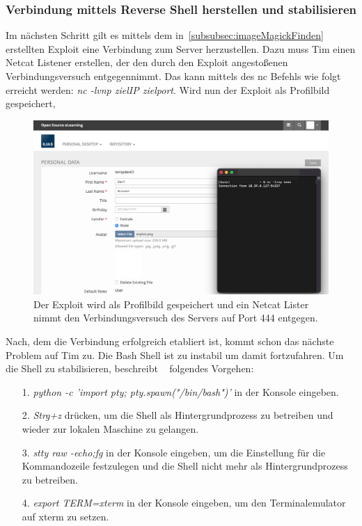 \documentclass[10pt, a4paper,onecolumn ,titlepage]{article}
\begin{document}
    \subsubsection{Verbindung mittels Reverse Shell herstellen und stabilisieren}
    \label{subsubsec:verbindunHerstellen}
    Im nächsten Schritt gilt es mittels dem in~\ref{subsubsec:imageMagickFinden} erstellten Exploit eine Verbindung zum Server herzustellen.
    Dazu muss Tim einen Netcat Listener erstellen, der den durch den Exploit angestoßenen Verbindungsversuch entgegennimmt.
    Das kann mittels des nc Befehls wie folgt erreicht werden: \textit{nc -lvnp zielIP zielport}.
    Wird nun der Exploit als Profilbild gespeichert,
    \begin{figure}[H]
        \centering
        \includegraphics[width=1\textwidth]{storyline_bilder_vm2/VerbindungDa}
        \caption{Der Exploit wird als Profilbild gespeichert und ein Netcat Lister nimmt den Verbindungsversuch des Servers auf Port 444 entgegen.}
        \label{fig:exploitHochladen}
    \end{figure}
    \noindent
    Nach, dem die Verbindung erfolgreich etabliert ist, kommt schon das nächste Problem auf Tim zu.
    Die Bash Shell ist zu instabil um damit fortzufahren.
    Um die Shell zu stabilisieren, beschreibt ~\textcite{shellStabilisieren} folgendes Vorgehen:

    \begin{enumerate}[leftmargin=2.5cm]
        \item[1.] \textit{python -c 'import pty; pty.spawn("/bin/bash")'}  in der Konsole eingeben.
        \item[2.] \textit{Strg+z}  drücken, um die Shell als Hintergrundprozess zu betreiben und wieder zur lokalen Maschine zu gelangen.
        \item[3.] \textit{stty raw -echo;fg}  in der Konsole eingeben, um die Einstellung für die Kommandozeile festzulegen und die Shell nicht mehr als Hintergrundprozess zu betreiben.
        \item[4.] \textit{export TERM=xterm}  in der Konsole eingeben, um den Terminalemulator auf xterm zu setzen.
    \end{enumerate}
\end{document}
